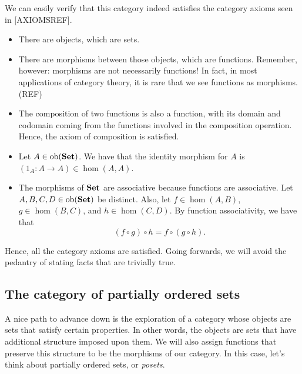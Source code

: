 \documentclass[10pt,a4paper,reqno]{amsart}
\numberwithin{figure}{section}
\begin{document}
We can easily verify that this category indeed satisfies the category axioms
seen in [AXIOMSREF].
\begin{itemize}
        \item There are objects, which are sets.
        \item There are morphisms between those objects, which are functions.
                Remember, however: morphisms are not necessarily functions! In fact,
                in most applications of category theory, it is rare that we see
                functions as morphisms. (REF)
        \item The composition of two functions is also a function, with its
                domain and codomain coming from the functions involved in the
                composition operation. Hence, the axiom of composition is
                satisfied.
        \item Let $A \in \operatorname{ob} ( \operatorname{\mathbf{Set}} )$. We have that the identity
                morphism for $A$ is $(1_A \colon A \to A) \in \hom (A, A)$.
        \item The morphisms of $\operatorname{\mathbf{Set}}$ are associative because functions are
                associative. Let $A, B, C, D \in \operatorname{ob} ( \operatorname{\mathbf{Set}} )$ be distinct. Also, let
                $f \in \hom (A, B)$, $g \in \hom (B, C)$, and $h \in
                \hom (C, D)$. By function associativity, we have that
                \[
                        ( f \circ g ) \circ h = f \circ ( g \circ h ).
                \]
\end{itemize}
Hence, all the category axioms are satisfied. Going forwards, we will avoid the
pedantry of stating facts that are trivially true.

\subsection{The category of partially ordered sets}
A nice path to advance down is the exploration of a category whose objects are
sets that satisfy certain properties. In other words, the objects are sets that have
additional structure imposed upon them. We will also assign functions that
preserve this structure to be the morphisms of our category. In this case,
let's think about partially ordered sets, or \emph{posets}.
\end{document}
